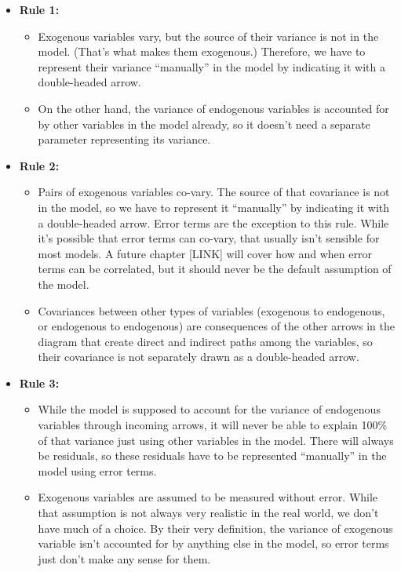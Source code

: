 \documentclass[
]{book}
\providecommand{\tightlist}{%
  \setlength{\itemsep}{0pt}\setlength{\parskip}{0pt}}
\begin{document}
\begin{itemize}
\tightlist
\item
  \textbf{Rule 1:}

  \begin{itemize}
  \tightlist
  \item
    Exogenous variables vary, but the source of their variance is not in the model. (That's what makes them exogenous.) Therefore, we have to represent their variance ``manually'' in the model by indicating it with a double-headed arrow.
  \item
    On the other hand, the variance of endogenous variables is accounted for by other variables in the model already, so it doesn't need a separate parameter representing its variance.
  \end{itemize}
\item
  \textbf{Rule 2:}

  \begin{itemize}
  \tightlist
  \item
    Pairs of exogenous variables co-vary. The source of that covariance is not in the model, so we have to represent it ``manually'' by indicating it with a double-headed arrow. Error terms are the exception to this rule. While it's possible that error terms can co-vary, that usually isn't sensible for most models. A future chapter {[}LINK{]} will cover how and when error terms can be correlated, but it should never be the default assumption of the model.
  \item
    Covariances between other types of variables (exogenous to endogenous, or endogenous to endogenous) are consequences of the other arrows in the diagram that create direct and indirect paths among the variables, so their covariance is not separately drawn as a double-headed arrow.
  \end{itemize}
\item
  \textbf{Rule 3:}

  \begin{itemize}
  \tightlist
  \item
    While the model is supposed to account for the variance of endogenous variables through incoming arrows, it will never be able to explain 100\% of that variance just using other variables in the model. There will always be residuals, so these residuals have to be represented ``manually'' in the model using error terms.
  \item
    Exogenous variables are assumed to be measured without error. While that assumption is not always very realistic in the real world, we don't have much of a choice. By their very definition, the variance of exogenous variable isn't accounted for by anything else in the model, so error terms just don't make any sense for them.
  \end{itemize}
\end{itemize}
\end{document}
